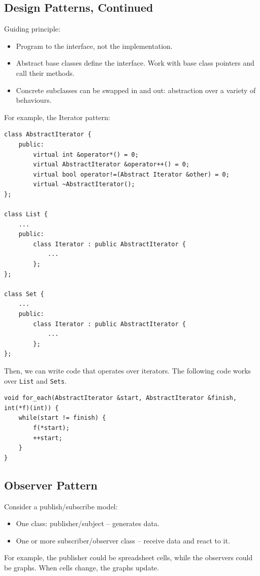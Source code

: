 \documentclass[11pt]{article}
\theoremstyle{definition}
\begin{document}
\subsection{Design Patterns, Continued}
Guiding principle:\vspace{-0.25cm}
\begin{itemize}
    \item Program to the interface, not the implementation.
    \item Abstract base classes define the interface. Work with base class pointers and call their methods.
    \item Concrete subclasses can be swapped in and out: abstraction over a variety of behaviours.
\end{itemize}
\vspace{-0.25cm}
For example, the Iterator pattern:
\begin{lstlisting}
class AbstractIterator {
    public:
        virtual int &operator*() = 0;
        virtual AbstractIterator &operator++() = 0;
        virtual bool operator!=(Abstract Iterator &other) = 0;
        virtual ~AbstractIterator();
};

class List {
    ...
    public:
        class Iterator : public AbstractIterator {
            ...
        };
};

class Set {
    ...
    public:
        class Iterator : public AbstractIterator {
            ...
        };
};
\end{lstlisting}
\vspace{-0.25cm}
Then, we can write code that operates over iterators. The following code works over {\tt List} and {\tt Sets}.
\begin{lstlisting}
void for_each(AbstractIterator &start, AbstractIterator &finish, int(*f)(int)) {
    while(start != finish) {
        f(*start);
        ++start;
    }
}
\end{lstlisting}

\subsection{Observer Pattern}
Consider a publish/subscribe model:\vspace{-0.25cm}
\begin{itemize}[\label{}]
    \item One class: publisher/subject -- generates data.
    \item One or more subscriber/observer class -- receive data and react to it.
\end{itemize}
\vspace{-0.25cm}
For example, the publisher could be spreadsheet cells, while the observers could be graphs. When cells change, the graphs update. 
\end{document}
